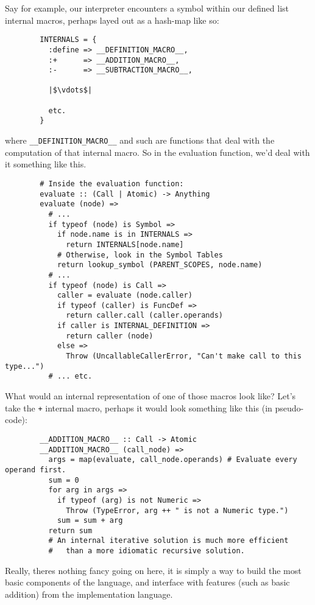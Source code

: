 \documentclass{article}
\newcommand{\code}[1]{\texttt{#1}}
\begin{document}
      Say for example, our interpreter encounters a symbol within our defined
      list internal macros, perhaps layed out as a hash-map like so:
      \begin{verbatim}
        INTERNALS = {
          :define => __DEFINITION_MACRO__,
          :+      => __ADDITION_MACRO__,
          :-      => __SUBTRACTION_MACRO__,

          |$\vdots$|

          etc.
        }
      \end{verbatim}

      where \code{\_\_DEFINITION\_MACRO\_\_} and such are functions that deal with
      the computation of that internal macro. So in the evaluation function,
      we'd deal with it something like this.
      \begin{verbatim}
        # Inside the evaluation function:
        evaluate :: (Call | Atomic) -> Anything
        evaluate (node) =>
          # ...
          if typeof (node) is Symbol =>
            if node.name is in INTERNALS =>
              return INTERNALS[node.name]
            # Otherwise, look in the Symbol Tables
            return lookup_symbol (PARENT_SCOPES, node.name)
          # ...
          if typeof (node) is Call =>
            caller = evaluate (node.caller)
            if typeof (caller) is FuncDef =>
              return caller.call (caller.operands)
            if caller is INTERNAL_DEFINITION =>
              return caller (node)
            else =>
              Throw (UncallableCallerError, "Can't make call to this type...")
          # ... etc.
      \end{verbatim}
      \clearpage
      What would an internal representation of one of those macros look like?
      Let's take the \code{+} internal macro, perhaps it would look something
      like this (in pseudo-code):
      \begin{verbatim}
        __ADDITION_MACRO__ :: Call -> Atomic
        __ADDITION_MACRO__ (call_node) =>
          args = map(evaluate, call_node.operands) # Evaluate every operand first.
          sum = 0
          for arg in args =>
            if typeof (arg) is not Numeric =>
              Throw (TypeError, arg ++ " is not a Numeric type.")
            sum = sum + arg
          return sum
          # An internal iterative solution is much more efficient
          #   than a more idiomatic recursive solution.
      \end{verbatim}
      Really, theres nothing fancy going on here, it is simply a way to build
      the most basic components of the language, and interface with features
      (such as basic addition) from the implementation language.
\end{document}

